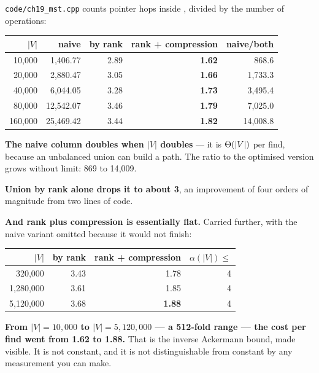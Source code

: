 \begin{worked}
\texttt{code/ch19\_mst.cpp} counts pointer hops inside ,
divided by the number of operations:

\begin{center}
\begin{tabular}{@{}rrrrr@{}}
\toprule
\rowcolor{primary!15}
$|V|$ & naive & by rank & rank + compression & naive/both \\
\midrule
 10{,}000 &  1{,}406.77 & 2.89 & \textbf{1.62} &   868.6 \\
 20{,}000 &  2{,}880.47 & 3.05 & \textbf{1.66} & 1{,}733.3 \\
 40{,}000 &  6{,}044.05 & 3.28 & \textbf{1.73} & 3{,}495.4 \\
 80{,}000 & 12{,}542.07 & 3.46 & \textbf{1.79} & 7{,}025.0 \\
160{,}000 & 25{,}469.42 & 3.44 & \textbf{1.82} & 14{,}008.8 \\
\bottomrule
\end{tabular}
\end{center}

\smallskip
\textbf{The naive column doubles when $|V|$ doubles} --- it is $\Theta(|V|)$ per
find, because an unbalanced union can build a path. The ratio to the optimised
version grows without limit: 869 to 14{,}009.

\smallskip
\textbf{Union by rank alone drops it to about 3}, an improvement of four orders
of magnitude from two lines of code.

\smallskip
\textbf{And rank plus compression is essentially flat.} Carried further, with
the naive variant omitted because it would not finish:

\begin{center}
\begin{tabular}{@{}rrrr@{}}
\toprule
\rowcolor{primary!15}
$|V|$ & by rank & rank + compression & $\alpha(|V|) \le$ \\
\midrule
   320{,}000 & 3.43 & 1.78 & 4 \\
 1{,}280{,}000 & 3.61 & 1.85 & 4 \\
 5{,}120{,}000 & 3.68 & \textbf{1.88} & 4 \\
\bottomrule
\end{tabular}
\end{center}

\smallskip
\textbf{From $|V| = 10{,}000$ to $|V| = 5{,}120{,}000$ --- a 512-fold range ---
the cost per find went from 1.62 to 1.88.} That is the inverse Ackermann bound,
made visible. It is not constant, and it is not distinguishable from constant by
any measurement you can make.
\end{worked}

